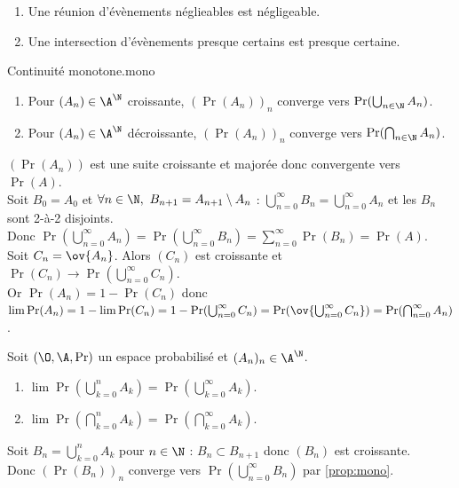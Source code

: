 \documentclass[11pt]{article}
\begin{document}
\vspace*{-0.9cm}

\begin{corr}{}{}
    \begin{enumerate}
        \item Une réunion d'évènements néglieables est négligeable.
        \item Une intersection d'évènements presque certains est presque certaine.
    \end{enumerate}
\end{corr}

\vspace*{-0.9cm}

\begin{prop}{Continuité monotone.}{mono}
    \begin{enumerate}
        \item Pour $(A_n)\in\A^\N$ croissante, $(\Pr(A_n))_n$ converge vers $\Pr(\bigcup_{n\in\N}A_n)$.
        \item Pour $(A_n)\in\A^\N$ décroissante, $(\Pr(A_n))_n$ converge vers $\Pr(\bigcap_{n\in\N}A_n)$.
    \end{enumerate}
    \tcblower
     $(\Pr(A_n))$ est une suite croissante et majorée donc convergente vers $\Pr(A)$.\\
    Soit $B_0 = A_0$ et $\forall n \in \N, ~ B_{n+1}=A_{n+1}\setminus A_n$ : $\bigcup_{n=0}^{\infty}B_n = \bigcup_{n=0}^\infty A_n$ et les $B_n$ sont 2-à-2 disjoints.\\
    Donc $\Pr(\bigcup_{n=0}^\infty A_n)=\Pr(\bigcup_{n=0}^{\infty}B_n)=\sum_{n=0}^{\infty}\Pr(B_n)=\Pr(A)$.\\
     Soit $C_n=\ov{A_n}$. Alors $(C_n)$ est croissante et $\Pr(C_n)\to \Pr(\bigcup_{n=0}^\infty C_n)$.\\
    Or $\Pr(A_n)=1-\Pr(C_n)$ donc $\lim \Pr(A_n) = 1 - \lim \Pr(C_n) = 1 - \Pr(\bigcup_{n=0}^\infty C_n) = \Pr(\ov{\bigcup_{n=0}^\infty C_n})=\Pr(\bigcap_{n=0}^{\infty}A_n)$.
\end{prop}

\vspace*{-0.9cm}

\begin{corr}{}{}
    Soit $(\O,\A,\Pr)$ un espace probabilisé et $(A_n)_n\in\A^\N$.
    \begin{enumerate}
        \item $\lim \Pr(\bigcup_{k=0}^n A_k)=\Pr(\bigcup_{k=0}^\infty A_k)$.
        \item $\lim \Pr(\bigcap_{k=0}^n A_k) = \Pr(\bigcap_{k=0}^\infty A_k)$.
    \end{enumerate}
    \tcblower
     Soit $B_n = \bigcup_{k=0}^n A_k$ pour $n\in\N$ : $B_n\subset B_{n+1}$ donc $(B_n)$ est croissante.\\
    Donc $(\Pr(B_n))_n$ converge vers $\Pr(\bigcup_{n=0}^\infty B_n)$ par \ref{prop:mono}.
\end{corr}
\end{document}
